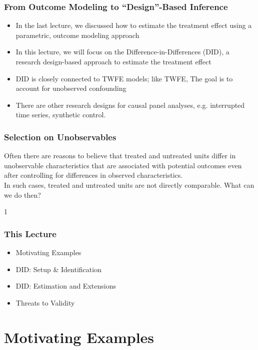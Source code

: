 \documentclass[xcolor=svgnames,9pt,english, aspectratio=169]{beamer}
\newcommand{\handout}{0}
\begin{document}
\begin{frame}
  \frametitle{From Outcome Modeling to ``Design''-Based Inference}
\begin{itemize}[<+->]\itemsep1em
\item In the last lecture, we discussed how to estimate the treatment effect
using a parametric, outcome modeling approach
\item In this lecture, we will focus on the Difference-in-Differences (DID), a
research design-based approach to estimate the treatment effect
\item DID is closely connected to TWFE models; like TWFE, The goal is to account for unobserved confounding
\item There are other research designs for causal panel analyses, e.g. interrupted time series, synthetic control.
\end{itemize}  
\end{frame}


\begin{frame}
  \frametitle{Selection on Unobservables}
\begin{Problem}
Often there are reasons to believe that treated and untreated units differ in unobservable
characteristics that are associated with potential outcomes even
after controlling for differences in observed characteristics.\\\bigskip In
such cases, treated and untreated units are not directly comparable. What can we
do then?
\end{Problem}
\end{frame}

\if\handout1
\begin{frame}
  \frametitle{This Lecture}
\begin{itemize}\itemsep1em
\item Motivating Examples
\item DID: Setup \& Identification
\item DID: Estimation and Extensions
\item Threats to Validity
\end{itemize}
\end{frame}
\fi

\section{Motivating Examples}
\end{document}
